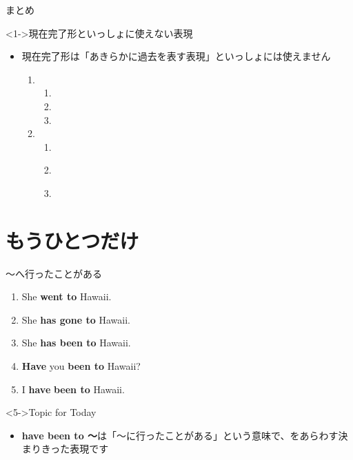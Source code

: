 \documentclass[aspectratio=169,xcolor={dvipsnames,table}]{beamer}
\begin{document}
\begin{frame}[plain]{まとめ}
  \begin{exampleblock}<1->{現在完了形といっしょに使えない表現}
\small

\begin{itemize}
 \item {現在完了形は「あきらかに過去を表す表現」といっしょには使えません\textdbend}
       \begin{enumerate}
	\item \begin{enumerate}
	       \item {}
	       \item {}
	       \item {}
	      \end{enumerate}
	\item \begin{enumerate}
	       \item {}
	       \item {}\\
	       \item {}
	      \end{enumerate}
       \end{enumerate}
\end{itemize}

\end{exampleblock}

\end{frame}
\section{もうひとつだけ}\begin{frame}[plain]{～へ行ったことがある}

\begin{enumerate}
 \item<1-> She \textbf{went to} Hawaii.
 \item<2-> She \textbf{has gone to} Hawaii.
 \item<3-> She \textbf{has been to} Hawaii.
 \item<4-> \textbf{Have} you  \textbf{been to} Hawaii?
 \item<5-> I \textbf{have}  \textbf{been to} Hawaii.
\end{enumerate}

\vfill

\begin{block}<5->{Topic for Today}\small
\textdbend
\begin{itemize}[square]\small
 \item \textbf{have been to ～}は「～に行ったことがある」という意味で、をあらわす決まりきった表現です
\end{itemize}
\end{block}
\end{frame}
\end{document}
